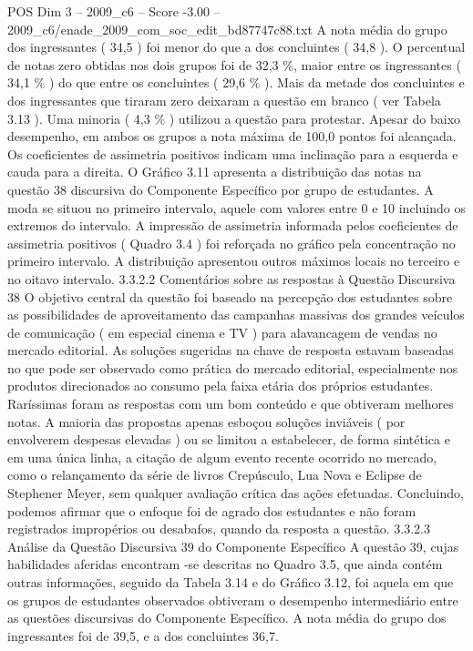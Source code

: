 \begin{textsample}{POS Dim 3 – 2009\_c6 – Score -3.00 – 2009\_c6/enade\_2009\_com\_soc\_edit\_bd87747c88.txt}
A nota média do grupo dos ingressantes ( 34,5 ) foi menor do que a dos concluintes ( 34,8 ).
O percentual de notas zero obtidas nos dois grupos foi de 32,3 \%, maior entre os ingressantes ( 34,1 \% ) do que entre os concluintes ( 29,6 \% ).
Mais da metade dos concluintes e dos ingressantes que tiraram zero deixaram a questão em branco ( ver Tabela 3.13 ).
Uma minoria ( 4,3 \% ) utilizou a questão para protestar.
Apesar do baixo desempenho, em ambos os grupos a nota máxima de 100,0 pontos foi alcançada.
Os coeficientes de assimetria positivos indicam uma inclinação para a esquerda e cauda para a direita.
O Gráfico 3.11 apresenta a distribuição das notas na questão 38 discursiva do Componente Específico por grupo de estudantes.
A moda se situou no primeiro intervalo, aquele com valores entre 0 e 10 incluindo os extremos do intervalo.
A impressão de assimetria informada pelos coeficientes de assimetria positivos ( Quadro 3.4 ) foi reforçada no gráfico pela concentração no primeiro intervalo.
A distribuição apresentou outros máximos locais no terceiro e no oitavo intervalo. 3.3.2.2 Comentários sobre as respostas à Questão Discursiva 38 O objetivo central da questão foi baseado na percepção dos estudantes sobre as possibilidades de aproveitamento das campanhas massivas dos grandes veículos de comunicação ( em especial cinema e TV ) para alavancagem de vendas no mercado editorial.
As soluções sugeridas na chave de resposta estavam baseadas no que pode ser observado como prática do mercado editorial, especialmente nos produtos direcionados ao consumo pela faixa etária dos próprios estudantes.
Raríssimas foram as respostas com um bom conteúdo e que obtiveram melhores notas.
A maioria das propostas apenas esboçou soluções inviáveis ( por envolverem despesas elevadas ) ou se limitou a estabelecer, de forma sintética e em uma única linha, a citação de algum evento recente ocorrido no mercado, como o relançamento da série de livros Crepúsculo, Lua Nova e Eclipse de Stephener Meyer, sem qualquer avaliação crítica das ações efetuadas.
Concluindo, podemos afirmar que o enfoque foi de agrado dos estudantes e não foram registrados impropérios ou desabafos, quando da resposta a questão. 3.3.2.3 Análise da Questão Discursiva 39 do Componente Específico A questão 39, cujas habilidades aferidas encontram -se descritas no Quadro 3.5, que ainda contém outras informações, seguido da Tabela 3.14 e do Gráfico 3.12, foi aquela em que os grupos de estudantes observados obtiveram o desempenho intermediário entre as questões discursivas do Componente Específico.
A nota média do grupo dos ingressantes foi de 39,5, e a dos concluintes 36,7.

\end{textsample}
